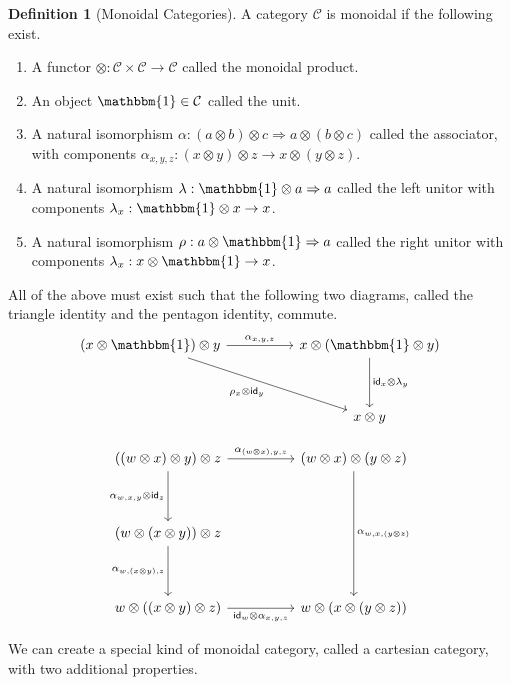 \documentclass[12pt]{article}
\theoremstyle{definition}
\newtheorem{definition}{Definition}
\begin{document}
\begin{definition}[Monoidal Categories]
    A category $\mathcal{C}$ is monoidal if the following exist.
    \begin{enumerate}
        \item A functor $\otimes:\mathcal{C}\times\mathcal{C}\rightarrow\mathcal{C}$ called the monoidal product.
        \item An object $\mathbbm{1}\in\mathcal{C}$ called the unit.
        \item A natural isomorphism $\alpha : (a\otimes b)\otimes c\Rightarrow a\otimes (b\otimes c)$ called the associator, with components $\alpha_{x,y,z}: (x\otimes y)\otimes z\rightarrow x\otimes (y\otimes z)$.
        \item A natural isomorphism $\lambda : \mathbbm{1}\otimes a\Rightarrow a$ called the left unitor with components $\lambda_x : \mathbbm{1}\otimes x\rightarrow x$.
        \item A natural isomorphism $\rho : a\otimes \mathbbm{1}\Rightarrow a$ called the right unitor with components $\lambda_x : x\otimes \mathbbm{1}\rightarrow x$.
    \end{enumerate}
    All of the above must exist such that the following two diagrams, called the triangle identity and the pentagon identity, commute.
    \[\begin{tikzcd}
            {(x\otimes\mathbbm{1})\otimes y} && {x\otimes(\mathbbm{1}\otimes y)} \\
            \\
            && {x\otimes y}
            \arrow["{{\rho_x\otimes \mathsf{id}_y}}"', from=1-1, to=3-3]
            \arrow["{{\mathsf{id}_x\otimes\lambda_y}}", from=1-3, to=3-3]
            \arrow["{{\alpha_{x,y,z}}}", from=1-1, to=1-3]
        \end{tikzcd}\]

    \[\begin{tikzcd}
            {((w\otimes x)\otimes y)\otimes z} && {(w\otimes x)\otimes(y\otimes z)} \\
            \\
            {(w\otimes (x\otimes y))\otimes z} \\
            \\
            {w\otimes ((x\otimes y)\otimes z)} && {w\otimes (x\otimes (y\otimes z))}
            \arrow["{{\alpha_{w,x,(y\otimes z)}}}", from=1-3, to=5-3]
            \arrow["{{\alpha_{(w\otimes x),y,z}}}", from=1-1, to=1-3]
            \arrow["{{\alpha_{w,x,y}\otimes \mathsf{id}_z}}"', from=1-1, to=3-1]
            \arrow["{{\alpha_{w,(x\otimes y),z}}}"', from=3-1, to=5-1]
            \arrow["{{\mathsf{id}_w\otimes \alpha_{x,y,z}}}"', from=5-1, to=5-3]
        \end{tikzcd}\]
\end{definition}
We can create a special kind of monoidal category, called a cartesian category, with two additional properties.
\end{document}
